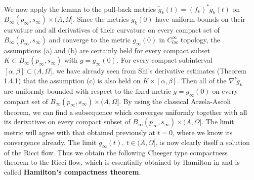 We now apply the lemma to the pull-back metrics
$\tilde{g}_k(t)=(f_k)^*g_k(t)$ on
$B_{\infty}(p_{\infty},s_{\infty}) \times (A,\Omega]$. Since the
metrics $\tilde{g}_k(0)$ have uniform bounds on their curvature
and all derivatives of their curvature on every compact set of
$B_{\infty}(p_{\infty},s_{\infty})$ and converge to the metric
$g_{\infty}(0)$ in $C^\infty_{loc}$ topology, the assumptions (a)
and (b) are certainly held for every compact subset $K \subset
B_{\infty}(p_{\infty},s_{\infty})$ with $g=g_{\infty}(0)$. For
every compact subinterval $[\alpha,\beta] \subset (A,\Omega]$, we
have already seen from Shi's derivative estimates (Theorem 1.4.1)
that the assumption (c) is also held on $K \times [\alpha,\beta]$.
Then all of the $\nabla^l\tilde{g}_k$ are uniformly bounded with
respect to the fixed metric $g = g_{\infty}(0)$ on every compact
set of $B_{\infty}(p_{\infty},s_{\infty})\times(A,\Omega]$. By
using the classical Arzela-Ascoli theorem, we can find a
subsequence which converges uniformly together with all its
derivatives on every compact subset of
$B_{\infty}(p_{\infty},s_{\infty})\times(A,\Omega]$. The limit
metric will agree with that obtained previously at $t=0$, where we
know its convergence already. The limit $g_{\infty}(t),\
t\in(A,\Omega]$, is now clearly itself a solution of the Ricci
flow. Thus we obtain the following Cheeger type compactness
theorem to the Ricci flow, which is essentially obtained by
Hamilton in \cite{Ha95} and is called \textbf{Hamilton's
compactness theorem}.


